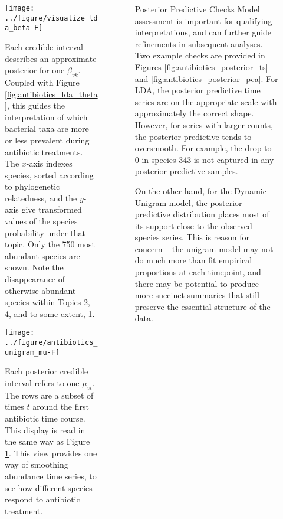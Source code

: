 \documentclass[final]{beamer}
\newlength{\onecolwid}
\begin{document}
\begin{frame}
\begin{columns}
\begin{column}{\onecolwid}
\begin{figure}[!p]
  \centering\texttt{[image: ../figure/visualize\_lda\_beta-F]}
  \caption{Each credible interval describes an approximate posterior for one
    $\beta_{vk}$. Coupled with Figure \ref{fig:antibiotics_lda_theta}, this
    guides the interpretation of which bacterial taxa are more or less prevalent
    during antibiotic treatments. The $x$-axis indexes species, sorted according
    to phylogenetic relatedness, and the $y$-axis give transformed values of the
    species probability under that topic. Only the 750 most abundant species are
    shown. Note the disappearance of otherwise abundant species within Topics 2,
    4, and to some extent, 1.} \label{fig:antibiotics_lda_beta}
\end{figure}

\begin{figure}[ht]
  \centering
  \texttt{[image: ../figure/antibiotics\_unigram\_mu-F]}
  \caption{Each posterior credible interval refers to one $\mu_{vt}$. The rows
    are a subset of times $t$ around the first antibiotic time course. This
    display is read in the same way as Figure \ref{fig:antibiotics_lda_beta}.
    This view provides one way of smoothing abundance time series, to see how
    different species respond to antibiotic
    treatment. \label{fig:antibiotics_unigram_theta} }
\end{figure}


\end{column}

\begin{column}{\onecolwid}

\begin{block}{Posterior Predictive Checks}
Model assessment is important for qualifying interpretations, and can further
guide refinements in subsequent analyses. Two example checks are provided in
Figures \ref{fig:antibiotics_posterior_ts} and
\ref{fig:antibiotics_posterior_pca}. For LDA, the posterior predictive time
series are on the appropriate scale with approximately the correct shape.
However, for series with larger counts, the posterior predictive tends to
oversmooth. For example, the drop to 0 in species 343 is not captured in any
posterior predictive samples.

On the other hand, for the Dynamic Unigram model, the posterior predictive
distribution places most of its support close to the observed species series.
This is reason for concern -- the unigram model may not do much more than fit
empirical proportions at each timepoint, and there may be potential to produce
more succinct summaries that still preserve the essential structure of the data.


\end{block}
\end{column}
\end{columns}
\end{frame}
\end{document}
